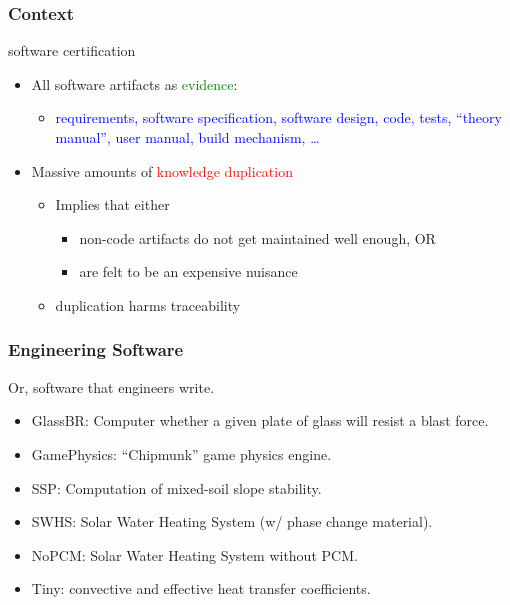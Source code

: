 \documentclass{beamer}
\begin{document}

\begin{frame}
\frametitle{Context}
{\Large software certification}
\vspace*{.2cm}
\begin{itemize}
\item<3->All software artifacts as \textcolor{green}{evidence}:
\begin{itemize}
\item \textcolor{blue}{requirements, software specification, software design, code, 
  tests, ``theory manual'', user manual, build mechanism, \ldots}
\end{itemize}
\vspace*{.5cm}
\item<4->Massive amounts of \textcolor{red}{knowledge duplication}
\begin{itemize}
  \item Implies that either
  \begin{itemize}
    \item non-code artifacts do not get maintained well enough, OR
    \item are felt to be an expensive nuisance
  \end{itemize}
  \item duplication harms traceability
\end{itemize}
\end{itemize}
\vfill
\end{frame}

\begin{frame}
\frametitle{Engineering Software}
Or, software that engineers write.
\begin{itemize}
\item {\color{blue}GlassBR}: Computer whether a given plate of glass will resist a blast force.
\item GamePhysics: ``Chipmunk'' game physics engine.
\item SSP: Computation of mixed-soil slope stability.
\item SWHS: Solar Water Heating System (w/ phase change material).
\item NoPCM: Solar Water Heating System without PCM.
\item Tiny: convective and effective heat transfer coefficients.
\end{itemize}
\end{frame}
\end{document}
